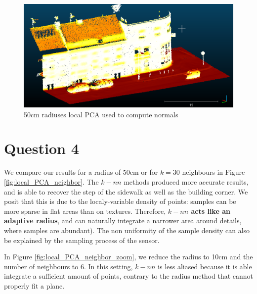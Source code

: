\documentclass[a4paper]{article}
\begin{document}
\begin{figure}[h]
  \centering
  \includegraphics[width=1.\linewidth]{figures/cc_normals_PCA_50cm_bigger_points.png}
  \caption{50cm radiuses local PCA used to compute normals}
  \label{fig:local_pca}
\end{figure}



\pagebreak

\section*{Question 4}

We compare our results for a radius of 50cm or for $k=30$ neighbours in Figure \ref{fig:local_PCA_neighbor}. The $k-nn$ methods 
produced more accurate results, and is able to recover the step of the sidewalk as well as the building corner. We posit that this is due
to the localy-variable density of points: samples can be more sparse in flat areas than on textures. Therefore, \textbf{$k-nn$ acts like
an adaptive radius}, and can naturally integrate a narrower area around details, where samples are abundant). The non uniformity of the
sample density can also be explained by the sampling process of the sensor.

In Figure \ref{fig:local_PCA_neighbor_zoom}, we reduce the radius to 10cm and the number of neighbours to 6. In this setting, $k-nn$ is less
aliased because it is able integrate a sufficient amount of points, contrary to the radius method that cannot properly fit a plane.
\end{document}
